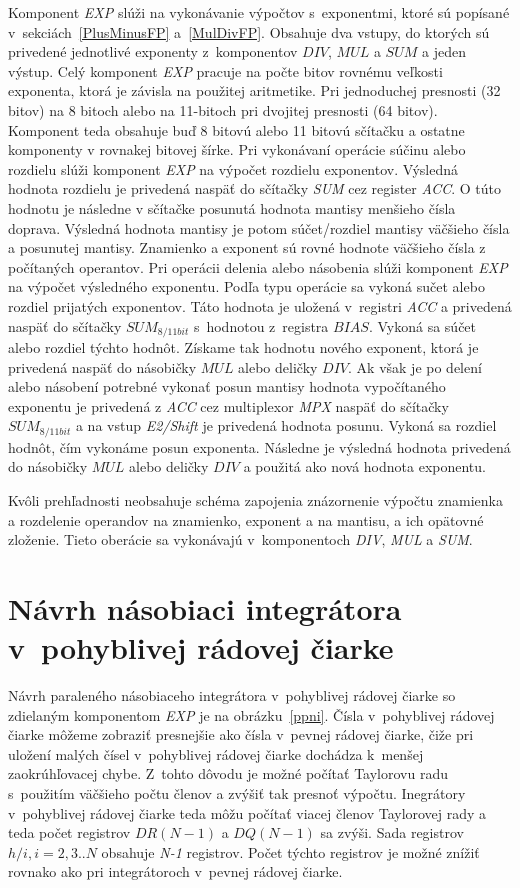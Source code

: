 Komponent \textit{EXP} slúži na vykonávanie výpočtov s~exponentmi, ktoré sú popísané v~sekciách~\ref{PlusMinusFP} a~\ref{MulDivFP}. Obsahuje dva vstupy, do ktorých sú privedené jednotlivé exponenty z~komponentov $ DIV $, $ MUL $ a $ SUM $ a jeden výstup. Celý komponent \textit{EXP} pracuje na počte bitov rovnému veľkosti exponenta, ktorá je závisla na použitej aritmetike. Pri jednoduchej presnosti (32 bitov) na 8 bitoch alebo na 11-bitoch pri dvojitej presnosti (64 bitov). Komponent teda obsahuje buď 8 bitovú alebo 11 bitovú sčítačku a ostatne komponenty v rovnakej bitovej šírke.
Pri vykonávaní operácie súčinu alebo rozdielu slúži komponent \textit{EXP} na výpočet rozdielu exponentov. Výsledná hodnota rozdielu je privedená naspäť do sčítačky \textit{SUM} cez register \textit{ACC}. O túto hodnotu je následne v sčítačke posunutá hodnota mantisy menšieho čísla doprava. Výsledná hodnota mantisy je potom súčet/rozdiel mantisy väčšieho čísla a posunutej mantisy. Znamienko a exponent sú rovné hodnote väčšieho čísla z počítaných operantov.
Pri operácii delenia alebo násobenia slúži komponent \textit{EXP} na výpočet výsledného exponentu. Podľa typu operácie sa vykoná sučet alebo rozdiel prijatých exponentov. Táto hodnota je uložená v~registri \textit{ACC} a privedená naspäť do sčítačky $ SUM_{8/11bit} $ s~hodnotou z~registra $ BIAS $. Vykoná sa súčet alebo rozdiel týchto hodnôt. Získame tak hodnotu nového exponent, ktorá je privedená naspäť do násobičky $ MUL $ alebo deličky $ DIV $. Ak však je po delení alebo násobení potrebné vykonať posun mantisy hodnota vypočítaného exponentu je privedená z \textit{ACC} cez multiplexor \textit{MPX} naspäť do sčítačky  $ SUM_{8/11bit} $ a na vstup \textit{E2/Shift} je privedená hodnota posunu. Vykoná sa rozdiel hodnôt, čím vykonáme posun exponenta. Následne je výsledná hodnota privedená do násobičky $ MUL $ alebo deličky $ DIV $ a použitá ako nová hodnota exponentu.

Kvôli prehľadnosti neobsahuje schéma zapojenia znázornenie výpočtu znamienka a rozdelenie operandov na znamienko, exponent a na mantisu, a ich opätovné zloženie. Tieto oberácie sa vykonávajú v~komponentoch \textit{DIV}, \textit{MUL} a \textit{SUM}.\\

\section{Návrh násobiaci integrátora v~pohyblivej rádovej čiarke}
Návrh paraleného násobiaceho integrátora v~pohyblivej rádovej čiarke so zdielaným komponentom \textit{EXP} je na obrázku~\ref{ppni}. Čísla v~pohyblivej rádovej čiarke môžeme zobraziť presnejšie ako čísla v~pevnej rádovej čiarke, čiže pri uložení malých čísel v~pohyblivej rádovej čiarke dochádza k~menšej zaokrúhľovacej chybe. Z~tohto dôvodu je možné počítať Taylorovu radu s~použitím väčšieho počtu členov a zvýšiť tak presnoť výpočtu. Inegrátory v~pohyblivej rádovej čiarke teda môžu počítať viacej členov Taylorovej rady a teda počet registrov $ DR(N-1) $ a $ DQ(N-1) $ sa zvýši. Sada registrov $ h/i, i=2,3..N $ obsahuje \textit{N-1} registrov. Počet týchto registrov je možné znížiť rovnako ako pri integrátoroch v~pevnej rádovej čiarke.

